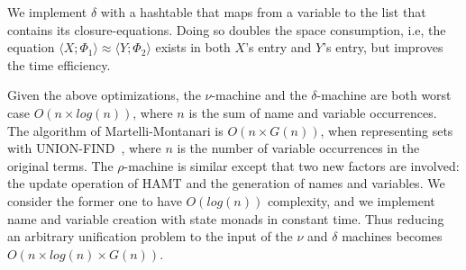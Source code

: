 \documentclass[a4paper,UKenglish]{lipics-v2016}
\newcommand{\clos}[2] {
  \langle #1; #2 \rangle
}
\newcommand{\aeq}[4] {
  \clos{#1}{#2} \approx \clos{#3}{#4}
}
\begin{document}
We implement $\delta$ with a hashtable that maps from a variable to
the list that contains its closure-equations.  Doing so doubles the
space consumption, i.e, the equation $\aeq{X}{\Phi_1}{Y}{\Phi_2}$
exists in both $X$'s entry and $Y$'s entry, but improves the time
efficiency.

Given the above optimizations, the $\nu$-machine and the
$\delta$-machine are both worst case $O(n \times log(n))$,
where $n$ is the sum of name and variable occurrences.
The algorithm of Martelli-Montanari is $O(n \times G(n))$, when
representing sets with UNION-FIND~\citep{tarjan_efficiency_1975}, where
$n$ is the number of variable occurrences in the original terms.  The
$\rho$-machine is similar except that two new factors are involved:
the update operation of HAMT and the generation of names and
variables.  We consider the former one to have $O(log(n))$ complexity,
and we implement name and variable creation with state monads in
constant time.  Thus reducing an arbitrary unification problem to the
input of the $\nu$ and $\delta$ machines becomes $O(n \times log(n) \times
G(n))$.

    \clearpage


\end{document}
